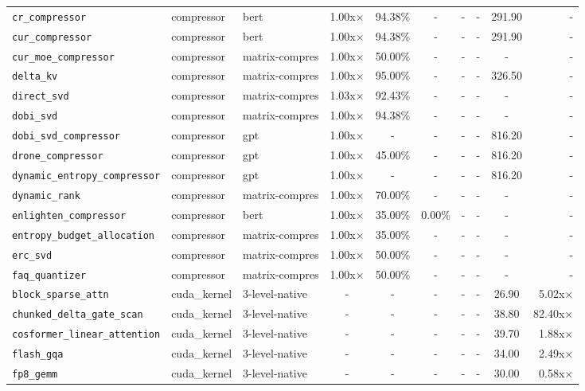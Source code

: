 \begin{center}
\begin{longtable}{lllccccccr}
\texttt{cr\_compressor} & compressor & bert & 1.00x$\times$ & 94.38\% & - & - & - & 291.90 & - \\
\texttt{cur\_compressor} & compressor & bert & 1.00x$\times$ & 94.38\% & - & - & - & 291.90 & - \\
\texttt{cur\_moe\_compressor} & compressor & matrix-compres & 1.00x$\times$ & 50.00\% & - & - & - & - & - \\
\texttt{delta\_kv} & compressor & matrix-compres & 1.00x$\times$ & 95.00\% & - & - & - & 326.50 & - \\
\texttt{direct\_svd} & compressor & matrix-compres & 1.03x$\times$ & 92.43\% & - & - & - & - & - \\
\texttt{dobi\_svd} & compressor & matrix-compres & 1.00x$\times$ & 94.38\% & - & - & - & - & - \\
\texttt{dobi\_svd\_compressor} & compressor & gpt & 1.00x$\times$ & - & - & - & - & 816.20 & - \\
\texttt{drone\_compressor} & compressor & gpt & 1.00x$\times$ & 45.00\% & - & - & - & 816.20 & - \\
\texttt{dynamic\_entropy\_compressor} & compressor & gpt & 1.00x$\times$ & - & - & - & - & 816.20 & - \\
\texttt{dynamic\_rank} & compressor & matrix-compres & 1.00x$\times$ & 70.00\% & - & - & - & - & - \\
\texttt{enlighten\_compressor} & compressor & bert & 1.00x$\times$ & 35.00\% & 0.00\% & - & - & - & - \\
\texttt{entropy\_budget\_allocation} & compressor & matrix-compres & 1.00x$\times$ & 35.00\% & - & - & - & - & - \\
\texttt{erc\_svd} & compressor & matrix-compres & 1.00x$\times$ & 50.00\% & - & - & - & - & - \\
\texttt{faq\_quantizer} & compressor & matrix-compres & 1.00x$\times$ & 50.00\% & - & - & - & - & - \\
\texttt{block\_sparse\_attn} & cuda\_kernel & 3-level-native & - & - & - & - & - & 26.90 & 5.02x$\times$ \\
\texttt{chunked\_delta\_gate\_scan} & cuda\_kernel & 3-level-native & - & - & - & - & - & 38.80 & 82.40x$\times$ \\
\texttt{cosformer\_linear\_attention} & cuda\_kernel & 3-level-native & - & - & - & - & - & 39.70 & 1.88x$\times$ \\
\texttt{flash\_gqa} & cuda\_kernel & 3-level-native & - & - & - & - & - & 34.00 & 2.49x$\times$ \\
\texttt{fp8\_gemm} & cuda\_kernel & 3-level-native & - & - & - & - & - & 30.00 & 0.58x$\times$ \\

\end{longtable}
\end{center}
